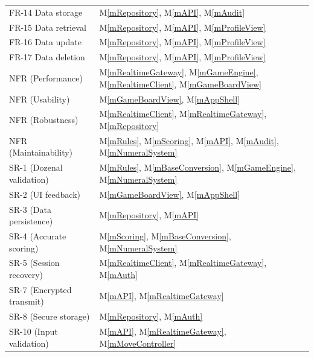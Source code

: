 \documentclass[12pt, titlepage]{article}
\newcommand{\mref}[1]{M\ref{#1}}
\begin{document}
\begin{table}[H]
\begin{tabularx}{\textwidth}{lX}
FR-14 Data storage & \mref{mRepository}, \mref{mAPI}, \mref{mAudit}\\
FR-15 Data retrieval & \mref{mRepository}, \mref{mAPI}, \mref{mProfileView}\\
FR-16 Data update & \mref{mRepository}, \mref{mAPI}, \mref{mProfileView}\\
FR-17 Data deletion & \mref{mRepository}, \mref{mAPI}, \mref{mProfileView}\\
\midrule
NFR (Performance) & \mref{mRealtimeGateway}, \mref{mGameEngine}, \mref{mRealtimeClient}, \mref{mGameBoardView}\\
NFR (Usability) & \mref{mGameBoardView}, \mref{mAppShell}\\
NFR (Robustness) & \mref{mRealtimeClient}, \mref{mRealtimeGateway}, \mref{mRepository}\\
NFR (Maintainability) & \mref{mRules}, \mref{mScoring}, \mref{mAPI}, \mref{mAudit}, \mref{mNumeralSystem}\\
\midrule
SR-1 (Dozenal validation) & \mref{mRules}, \mref{mBaseConversion}, \mref{mGameEngine}, \mref{mNumeralSystem}\\
SR-2 (UI feedback) & \mref{mGameBoardView}, \mref{mAppShell}\\
SR-3 (Data persistence) & \mref{mRepository}, \mref{mAPI}\\
SR-4 (Accurate scoring) & \mref{mScoring}, \mref{mBaseConversion}, \mref{mNumeralSystem}\\
SR-5 (Session recovery) & \mref{mRealtimeClient}, \mref{mRealtimeGateway}, \mref{mAuth}\\
SR-7 (Encrypted transmit) & \mref{mAPI}, \mref{mRealtimeGateway}\\
SR-8 (Secure storage) & \mref{mRepository}, \mref{mAuth} \\
SR-10 (Input validation) & \mref{mAPI}, \mref{mRealtimeGateway}, \mref{mMoveController}\\
\bottomrule
\end{tabularx}
\end{table}
\end{document}
